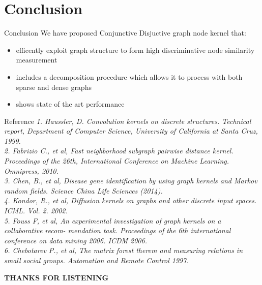 \documentclass{beamer}
\begin{document}
\section{Conclusion}
\normalsize
	\begin{frame}{Conclusion}
	We have proposed Conjunctive Disjuctive graph node kernel that: \vspace{.4em}
	\begin{itemize}
		\item efficently exploit graph structure to form high discriminative node similarity measurement \vspace{.4em}
		\item includes a decomposition procedure which allows it to process with both sparse and dense graphs \vspace{.4em}
		\item shows state of the art performance
	\end{itemize}
	\end{frame}
\small
\begin{frame}{Reference }
\textit{1. Haussler, D. Convolution kernels on discrete structures. Technical report,
Department of Computer Science, University of California at Santa Cruz, 1999. \\
2. Fabrizio C., et al, Fast neighborhood subgraph pairwise distance kernel.
Proceedings of the 26th, International Conference on Machine Learning. Omnipress, 2010. \\
3. Chen, B., et al, Disease gene identification by using graph kernels and Markov random
fields. Science China Life Sciences (2014). \\
4. Kondor, R., et al, Diffusion kernels on graphs and other discrete input
spaces. ICML. Vol. 2. 2002. \\
5. Fouss F, et al, An experimental investigation of graph kernels on a collaborative recom-
mendation task. Proceedings of the 6th international conference on data mining 2006.
ICDM 2006.\\
6. Chebotarev P., et al, The matrix forest therem and measuring relations in small
social groups. Automation and Remote Control 1997.}
\end{frame}
	\begin{frame}
	\begin{center}
		\textbf{THANKS FOR LISTENING}	
	\end{center}

	\end{frame}
\end{document}
